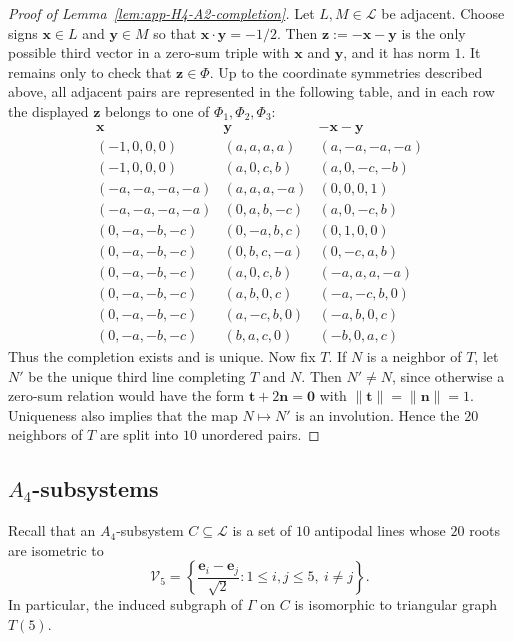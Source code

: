 \documentclass[11pt]{article}
\theoremstyle{definition}
\begin{document}
\begin{proof}[Proof of Lemma~\ref{lem:app-H4-A2-completion}]
Let \(L,M\in\mathcal L\) be adjacent.  Choose signs
\(\boldsymbol{x}\in L\) and \(\boldsymbol{y}\in M\) so that
\(\boldsymbol{x}\cdot\boldsymbol{y}=-1/2\).  Then
\(\boldsymbol{z}:=-\boldsymbol{x}-\boldsymbol{y}\) is the only possible
third vector in a zero-sum triple with \(\boldsymbol{x}\) and
\(\boldsymbol{y}\), and it has norm \(1\).  It remains only to check that
\(\boldsymbol{z}\in\Phi\).  Up to the coordinate symmetries described
above, all adjacent pairs are represented in the following table, and in
each row the displayed \(\boldsymbol{z}\) belongs to one of
\(\Phi_{1},\Phi_{2},\Phi_{3}\):
\[
\begin{array}{c|c|c}
\boldsymbol{x} & \boldsymbol{y} & -\boldsymbol{x}-\boldsymbol{y}\\
\hline
(-1,0,0,0) & (a,a,a,a) & (a,-a,-a,-a)\\
(-1,0,0,0) & (a,0,c,b) & (a,0,-c,-b)\\
(-a,-a,-a,-a) & (a,a,a,-a) & (0,0,0,1)\\
(-a,-a,-a,-a) & (0,a,b,-c) & (a,0,-c,b)\\
(0,-a,-b,-c) & (0,-a,b,c) & (0,1,0,0)\\
(0,-a,-b,-c) & (0,b,c,-a) & (0,-c,a,b)\\
(0,-a,-b,-c) & (a,0,c,b) & (-a,a,a,-a)\\
(0,-a,-b,-c) & (a,b,0,c) & (-a,-c,b,0)\\
(0,-a,-b,-c) & (a,-c,b,0) & (-a,b,0,c)\\
(0,-a,-b,-c) & (b,a,c,0) & (-b,0,a,c)
\end{array}
\]
Thus the completion exists and is unique.  Now fix \(T\).  If \(N\) is a
neighbor of \(T\), let \(N'\) be the unique third line completing \(T\) and \(N\).  
Then \(N'\ne N\), since otherwise a zero-sum relation would have
the form \(\boldsymbol{t}+2\boldsymbol{n}=\boldsymbol{0}\) with
\(\|\boldsymbol{t}\|=\|\boldsymbol{n}\|=1\).  
Uniqueness also implies that
the map \(N\mapsto N'\) is an involution.  
Hence the \(20\) neighbors of
\(T\) are split into \(10\) unordered pairs.
\end{proof}

\subsection{\texorpdfstring{\(A_{4}\)}{A4}-subsystems}
\label{app:H4-A4-incidences}

Recall that an \(A_{4}\)-subsystem $C\subseteq \mathcal{L}$ is a set of \(10\) antipodal lines whose
\(20\) roots are isometric to
\[
    \mathcal V_{5}=
    \left\{\frac{\boldsymbol{e}_{i}-\boldsymbol{e}_{j}}{\sqrt{2}}:
    1\le i,j\le5,\ i\ne j\right\}.
\]
In particular, the induced subgraph of $\Gamma$  on \(C\) is isomorphic to triangular graph \(T(5)\).
\end{document}
